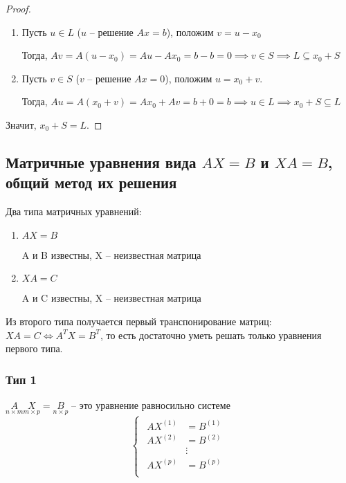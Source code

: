 \begin{proof}~
    \begin{enumerate}
    \item
        Пусть $u \in L$ ($u$ -- решение $Ax = b$), положим $v = u - x_0$

        Тогда, $Av = A(u - x_0) = Au - Ax_0 = b - b = 0 \implies v \in S \implies L \subseteq x_0 + S$

    \item
        Пусть $v \in S$ ($v$ -- решение $Ax = 0$), положим $u = x_0 + v$.

        Тогда, $Au = A(x_0 + v) = Ax_0 + Av = b + 0 = b \implies u \in L \implies x_0 + S \subseteq L$
    \end{enumerate}

    Значит, $x_0 + S = L$.
\end{proof}


\subsection{Матричные уравнения вида $AX = B$ и $XA = B$, общий метод их решения}

Два типа матричных уравнений:
\begin{enumerate}
\item $AX = B$

    A и B известны,
    X -- неизвестная матрица

\item $XA = C$

    A и C известны,
    X -- неизвестная матрица
\end{enumerate}

Из второго типа получается первый транспонирование матриц: $XA = C \iff A^T X = B^T$, то есть достаточно уметь решать только уравнения первого типа.


\subsubsection{Тип 1}

$\underset{n \times m}{A} \underset{m \times p}{X} = \underset{n \times p}{B}$ -- это уравнение равносильно системе
\begin{equation*}
    \begin{cases}
        \begin{aligned}
            AX^{(1)} &= B^{(1)} \\
            AX^{(2)} &= B^{(2)} \\
            &\vdots \\
            AX^{(p)} &= B^{(p)} \\
        \end{aligned}
    \end{cases}
\end{equation*}

